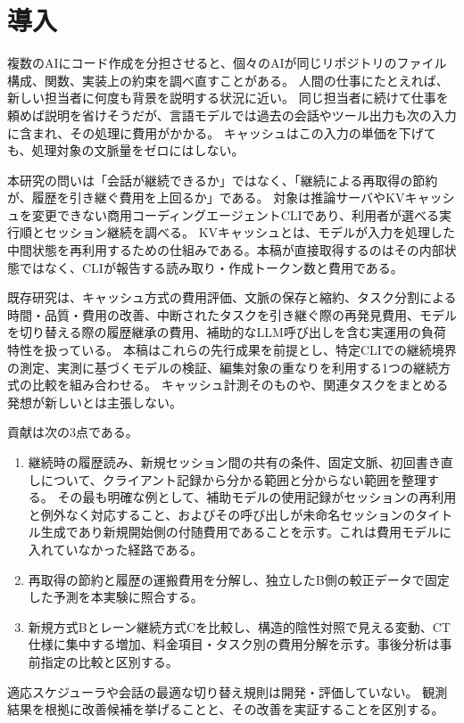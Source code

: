 \documentclass[a4paper,11pt]{article}
\begin{document}
\begingroup
\small\setlength{\parskip}{0pt}\renewcommand{\baselinestretch}{1.0}\selectfont
\tableofcontents
\endgroup
\clearpage

\section{導入}\label{sec:intro}
複数のAIにコード作成を分担させると、個々のAIが同じリポジトリのファイル構成、関数、実装上の約束を調べ直すことがある。
人間の仕事にたとえれば、新しい担当者に何度も背景を説明する状況に近い。
同じ担当者に続けて仕事を頼めば説明を省けそうだが、言語モデルでは過去の会話やツール出力も次の入力に含まれ、その処理に費用がかかる。
キャッシュはこの入力の単価を下げても、処理対象の文脈量をゼロにはしない。

本研究の問いは「会話が継続できるか」ではなく、「継続による再取得の節約が、履歴を引き継ぐ費用を上回るか」である。
対象は推論サーバやKVキャッシュを変更できない商用コーディングエージェントCLIであり、利用者が選べる実行順とセッション継続を調べる。
KVキャッシュとは、モデルが入力を処理した中間状態を再利用するための仕組みである。本稿が直接取得するのはその内部状態ではなく、CLIが報告する読み取り・作成トークン数と費用である。

既存研究は、キャッシュ方式の費用評価\cite{dontbreakcache}、文脈の保存と縮約\cite{cmv}、タスク分割による時間・品質・費用の改善\cite{cocoder}、中断されたタスクを引き継ぐ際の再発見費用\cite{handoffdebt}、モデルを切り替える際の履歴継承の費用\cite{handofftax}、補助的なLLM呼び出しを含む実運用の負荷特性\cite{agenticworkloads}を扱っている。
本稿はこれらの先行成果を前提とし、特定CLIでの継続境界の測定、実測に基づくモデルの検証、編集対象の重なりを利用する1つの継続方式の比較を組み合わせる。
キャッシュ計測そのものや、関連タスクをまとめる発想が新しいとは主張しない。

貢献は次の3点である。
\begin{enumerate}
\item 継続時の履歴読み、新規セッション間の共有の条件、固定文脈、初回書き直しについて、クライアント記録から分かる範囲と分からない範囲を整理する。
その最も明確な例として、補助モデルの使用記録がセッションの再利用と例外なく対応すること、およびその呼び出しが未命名セッションのタイトル生成であり新規開始側の付随費用であることを示す。これは費用モデルに入れていなかった経路である。
\item 再取得の節約と履歴の運搬費用を分解し、独立したB側の較正データで固定した予測を本実験に照合する。
\item 新規方式Bとレーン継続方式Cを比較し、構造的陰性対照で見える変動、CT仕様に集中する増加、料金項目・タスク別の費用分解を示す。事後分析は事前指定の比較と区別する。
\end{enumerate}
適応スケジューラや会話の最適な切り替え規則は開発・評価していない。
観測結果を根拠に改善候補を挙げることと、その改善を実証することを区別する。
\end{document}
